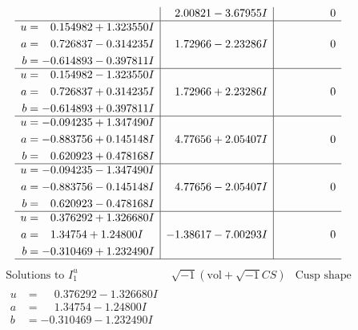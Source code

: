 \documentclass[1p]{elsarticle_modified}
\theoremstyle{definition}
\newcommand{\I}{\sqrt{-1}}
\begin{document}
$$\begin{array}{c|c|c}
 & \phantom{-}2.00821 - 3.67955 I & \phantom{-0.000000 } 0 \\ \hline\begin{aligned}
u &= \phantom{-}0.154982 + 1.323550 I \\
a &= \phantom{-}0.726837 - 0.314235 I \\
b &= -0.614893 - 0.397811 I\end{aligned}
 & \phantom{-}1.72966 - 2.23286 I & \phantom{-0.000000 } 0 \\ \hline\begin{aligned}
u &= \phantom{-}0.154982 - 1.323550 I \\
a &= \phantom{-}0.726837 + 0.314235 I \\
b &= -0.614893 + 0.397811 I\end{aligned}
 & \phantom{-}1.72966 + 2.23286 I & \phantom{-0.000000 } 0 \\ \hline\begin{aligned}
u &= -0.094235 + 1.347490 I \\
a &= -0.883756 + 0.145148 I \\
b &= \phantom{-}0.620923 + 0.478168 I\end{aligned}
 & \phantom{-}4.77656 + 2.05407 I & \phantom{-0.000000 } 0 \\ \hline\begin{aligned}
u &= -0.094235 - 1.347490 I \\
a &= -0.883756 - 0.145148 I \\
b &= \phantom{-}0.620923 - 0.478168 I\end{aligned}
 & \phantom{-}4.77656 - 2.05407 I & \phantom{-0.000000 } 0 \\ \hline\begin{aligned}
u &= \phantom{-}0.376292 + 1.326680 I \\
a &= \phantom{-}1.34754 + 1.24800 I \\
b &= -0.310469 + 1.232490 I\end{aligned}
 & -1.38617 - 7.00293 I & \phantom{-0.000000 } 0\\
 \hline 
 \end{array}$$\newpage$$\begin{array}{c|c|c}  
\text{Solutions to }I^u_{1}& \I (\text{vol} + \sqrt{-1}CS) & \text{Cusp shape}\\
 \hline 
\begin{aligned}
u &= \phantom{-}0.376292 - 1.326680 I \\
a &= \phantom{-}1.34754 - 1.24800 I \\
b &= -0.310469 - 1.232490 I\end{aligned}

\end{array}$$
\end{document}
